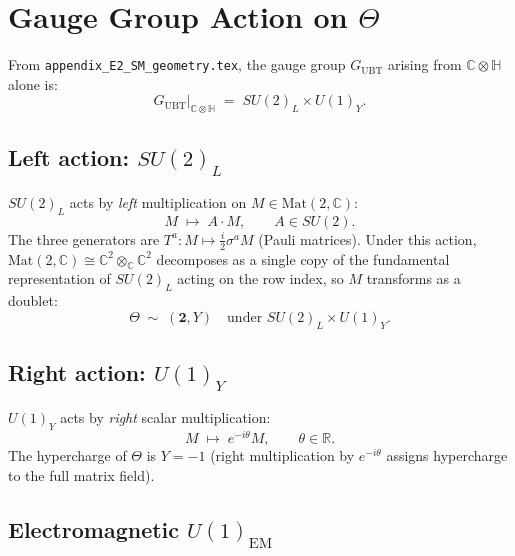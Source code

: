 \documentclass[12pt,a4paper]{article}
\theoremstyle{definition}
\theoremstyle{remark}
\newcommand{\C}{\mathbb{C}}
\newcommand{\R}{\mathbb{R}}
\renewcommand{\H}{\mathbb{H}}
\begin{document}
\section{Gauge Group Action on $\Theta$}
\label{sec:gauge}

From \texttt{appendix\_E2\_SM\_geometry.tex}, the gauge group $G_\mathrm{UBT}$
arising from $\C \otimes \H$ alone is:
\begin{equation}
  G_\mathrm{UBT}\big|_{\C \otimes \H}
  \;=\; SU(2)_L \times U(1)_Y.
  \label{eq:gauge_group}
\end{equation}

\subsection{Left action: $SU(2)_L$}

$SU(2)_L$ acts by \emph{left} multiplication on $M \in \mathrm{Mat}(2,\C)$:
\begin{equation}
  M \;\longmapsto\; A \cdot M, \qquad A \in SU(2).
  \label{eq:SU2_action}
\end{equation}
The three generators are $T^a: M \mapsto \frac{i}{2}\sigma^a M$ (Pauli matrices).
Under this action, $\mathrm{Mat}(2,\C) \cong \C^2 \otimes_\C \C^2$ decomposes
as a single copy of the fundamental representation of $SU(2)_L$ acting on the
row index, so $M$ transforms as a doublet:
\begin{equation}
  \Theta \;\sim\; (\mathbf{2}, Y)
  \quad \text{under } SU(2)_L \times U(1)_Y.
  \label{eq:doublet}
\end{equation}

\subsection{Right action: $U(1)_Y$}

$U(1)_Y$ acts by \emph{right} scalar multiplication:
\begin{equation}
  M \;\longmapsto\; e^{-i\theta} M, \qquad \theta \in \R.
  \label{eq:U1Y_action}
\end{equation}
The hypercharge of $\Theta$ is $Y = -1$ (right multiplication by $e^{-i\theta}$
assigns hypercharge to the full matrix field).

\subsection{Electromagnetic $U(1)_\mathrm{EM}$}
\end{document}
